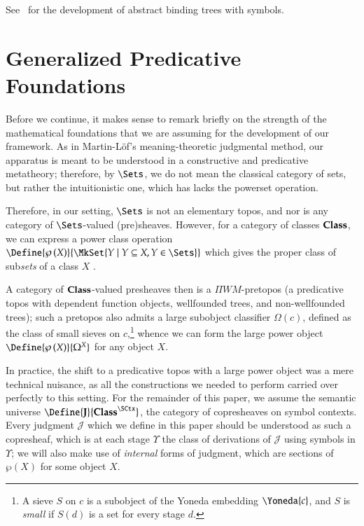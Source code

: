 \documentclass[11pt]{article}
\theoremstyle{definition}
\theoremstyle{notation}
\theoremstyle{remark}
\numberwithin{equation}{section}
\newcommand\Pow[1]{\wp\left(#1\right)}
\begin{document}
See~\cite{sterling-morrison:2015} for the development of abstract binding trees
with symbols. 

\section{Generalized Predicative Foundations}

Before we continue, it makes sense to remark briefly on the strength of the
mathematical foundations that we are assuming for the development of our
framework. As in Martin-L\"of's meaning-theoretic judgmental method, our
apparatus is meant to be understood in a constructive and predicative
metatheory; therefore, by $\Sets$, we do not mean the classical category of
sets, but rather the intuitionistic one, which has lacks the powerset
operation.

Therefore, in our setting, $\Sets$ is not an elementary topos, and nor is any
category of $\Sets$-valued (pre)sheaves. However, for a category of classes
$\mathbf{Class}$, we can express a power class operation
$\Define{\Pow{X}}{\MkSet{Y\mid Y\subseteq X, Y\in\Sets}}$ which gives the
proper class of sub\emph{sets} of a class $X$ \cite{gambino:2002}.

A category of $\mathbf{Class}$-valued presheaves then is a $\Pi W M$-pretopos (a
predicative topos with dependent function objects, wellfounded trees, and
non-wellfounded trees); such a pretopos also admits a large subobject
classifier $\Omega(c)$, defined as the class of small sieves on
$c$,\footnote{A sieve $S$ on $c$ is a subobject of the Yoneda
embedding $\Yoneda{c}$, and $S$ is \emph{small} if $S(d)$ is a set for every
stage $d$.} whence we can form the large power object
$\Define{\Pow{X}}{\Omega^X}$ for any object $X$.

In practice, the shift to a predicative topos with a large power object was a
mere technical nuisance, as all the constructions we needed to perform carried
over perfectly to this setting. For the remainder of this paper, we assume the
semantic universe $\Define{\SemU}{\Classes^\SCtx}$, the category of
copresheaves on symbol contexts. Every judgment $\mathcal{J}$ which we define
in this paper should be understood as such a copresheaf, which is at each stage
$\Upsilon$ the class of derivations of $\mathcal{J}$ using symbols in
$\Upsilon$; we will also make use of \emph{internal} forms of judgment, which
are sections of $\Pow{X}$ for some object $X$.
\end{document}
